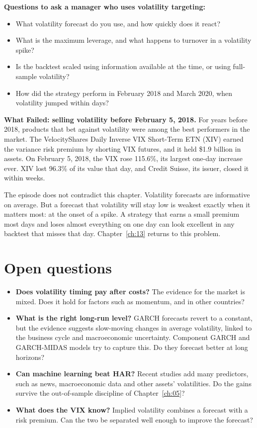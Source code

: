 \textbf{Questions to ask a manager who uses volatility targeting:}

\begin{itemize}
  \item What volatility forecast do you use, and how quickly does it react?
  \item What is the maximum leverage, and what happens to turnover in a volatility spike?
  \item Is the backtest scaled using information available at the time, or using full-sample volatility?
  \item How did the strategy perform in February 2018 and March 2020, when volatility jumped within days?
\end{itemize}

\begin{callout}
\textbf{What Failed: selling volatility before February 5, 2018.} For years before 2018, products that bet against volatility were among the best performers in the market. The VelocityShares Daily Inverse VIX Short-Term ETN (XIV) earned the variance risk premium by shorting VIX futures, and it held \$1.9 billion in assets. On February 5, 2018, the VIX rose 115.6\%, its largest one-day increase ever. XIV lost 96.3\% of its value that day, and Credit Suisse, its issuer, closed it within weeks.

The episode does not contradict this chapter. Volatility forecasts are informative on average. But a forecast that volatility will stay low is weakest exactly when it matters most: at the onset of a spike. A strategy that earns a small premium most days and loses almost everything on one day can look excellent in any backtest that misses that day. Chapter~\ref{ch:13} returns to this problem.
\end{callout}

\section{Open questions}
\label{sec:11-open}

\begin{itemize}
  \item \textbf{Does volatility timing pay after costs?} The evidence for the market is mixed. Does it hold for factors such as momentum, and in other countries?
  \item \textbf{What is the right long-run level?} GARCH forecasts revert to a constant, but the evidence suggests slow-moving changes in average volatility, linked to the business cycle and macroeconomic uncertainty. Component GARCH and GARCH-MIDAS models try to capture this. Do they forecast better at long horizons?
  \item \textbf{Can machine learning beat HAR?} Recent studies add many predictors, such as news, macroeconomic data and other assets' volatilities. Do the gains survive the out-of-sample discipline of Chapter~\ref{ch:05}?
  \item \textbf{What does the VIX know?} Implied volatility combines a forecast with a risk premium. Can the two be separated well enough to improve the forecast?
\end{itemize}

